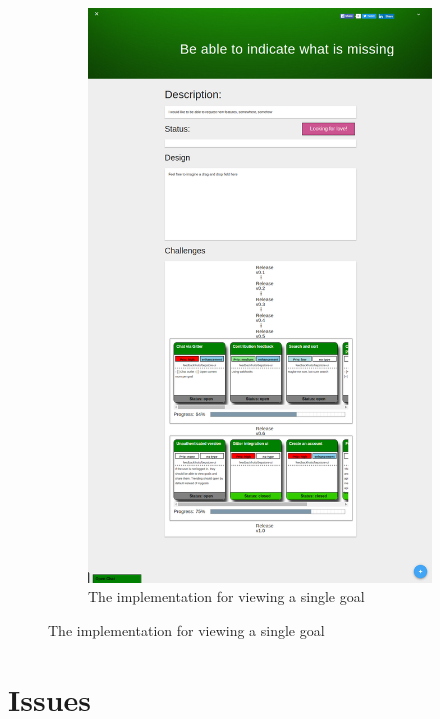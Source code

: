 \begin{figure}[ht!]
\begin{subfigure}[b]{0.45\textwidth}
        \includegraphics[width=\textwidth, height=0.45\textheight, keepaspectratio]{./media/goal_implementation}
        \caption{The implementation for viewing a single goal}
        \label{fig:goal-implementation}
    \end{subfigure}
\end{figure}
\clearpage
\section{Issues}

